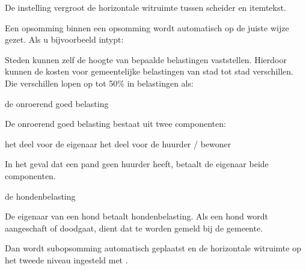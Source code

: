 \haalbuffer

De instelling  vergroot de horizontale witruimte
tussen scheider en itemtekst.


Een opsomming binnen een opsomming wordt automatisch op de
juiste wijze gezet. Als u bijvoorbeeld intypt:

\startbuffer
Steden kunnen zelf de hoogte van bepaalde belastingen
vaststellen. Hierdoor kunnen de kosten voor gemeentelijke
belastingen van stad tot stad verschillen. Die verschillen
lopen op tot 50\% in belastingen als:

\stelopsommingin[2][breedte=5em]
\startopsomming[n]

\som de onroerend goed belasting

     De onroerend goed belasting bestaat uit twee
     componenten:

     \startopsomming[a,opelkaar]
     \som het deel voor de eigenaar
     \som het deel voor de huurder / bewoner
     \stopopsomming

     In het geval dat een pand geen huurder heeft, betaalt
     de eigenaar beide componenten.

\som de hondenbelasting

     De eigenaar van een hond betaalt hondenbelasting. Als een
     hond wordt aangeschaft of doodgaat, dient dat te worden
     gemeld bij de gemeente.

\stopopsomming
\stopbuffer

\typebuffer

Dan wordt subopsomming automatisch geplaatst en de
horizontale witruimte op het tweede niveau ingesteld met
\type{\stelopsommingin[2][breedte=5em]}.

\start
\haalbuffer
\stop

\stoponderdeel
